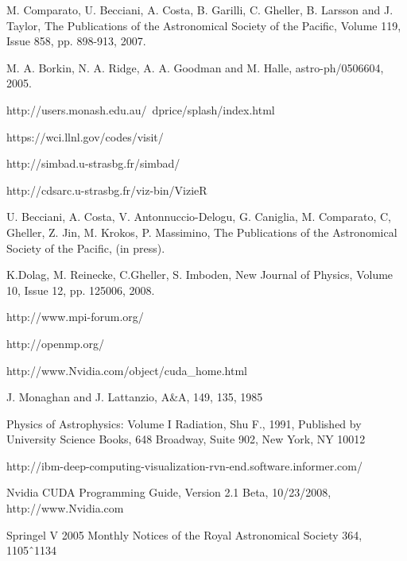 \documentclass[1p,times]{elsarticle}
\begin{document}
\begin{thebibliography}{00}
M. Comparato, U. Becciani, A. Costa, B. Garilli, C. Gheller, B. Larsson and J. Taylor, 
The Publications of the Astronomical Society of the Pacific, Volume 119, Issue 858, pp. 898-913, 2007.

 M. A. Borkin, N. A. Ridge, A. A. Goodman and M. Halle, astro-ph/0506604, 2005.

 http://users.monash.edu.au/~dprice/splash/index.html

 https://wci.llnl.gov/codes/visit/

 http://simbad.u-strasbg.fr/simbad/

 http://cdsarc.u-strasbg.fr/viz-bin/VizieR

U. Becciani, A. Costa, V. Antonnuccio-Delogu, G. Caniglia, M. Comparato, 
C, Gheller, Z. Jin, M. Krokos, P. Massimino, 
The Publications of the Astronomical Society of the Pacific, (in press).

K.Dolag, M. Reinecke, C.Gheller, S. Imboden, 
New Journal of Physics, Volume 10, Issue 12, pp. 125006, 2008.

 http://www.mpi-forum.org/

 http://openmp.org/

 http://www.Nvidia.com/object/cuda\_home.html

 J. Monaghan and J. Lattanzio, A\&A, 149, 135, 1985

 Physics of Astrophysics: Volume I Radiation, Shu F., 1991,
Published by University Science Books, 648 Broadway, Suite 902, New York, NY 10012

 http://ibm-deep-computing-visualization-rvn-end.software.informer.com/

 Nvidia CUDA Programming Guide, Version 2.1 Beta, 10/23/2008, http://www.Nvidia.com

 Springel V 2005 Monthly Notices of the Royal Astronomical Society 364, 1105ˆ1134

\end{thebibliography}
\end{document}
